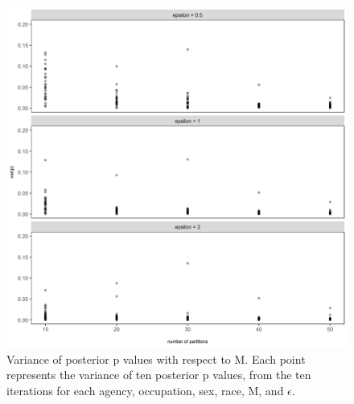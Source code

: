 \documentclass[10pt, letterpaper]{article}
\begin{document}
\begin{spacing}{1.0}
\begin{figure}[]
    \centering
    \includegraphics[width=6in]{RacePayDifferential-p-Variance-nPartitions.png}
    \caption{Variance of posterior p values with respect to M.  Each point represents the variance of ten posterior p values, from the ten iterations for each agency, occupation, sex, race, M, and $\epsilon$.}
    \label{figure:RacePayDifferential-p-Variance-nPartitions}
\end{figure}

\clearpage



\end{spacing}
\end{document}
